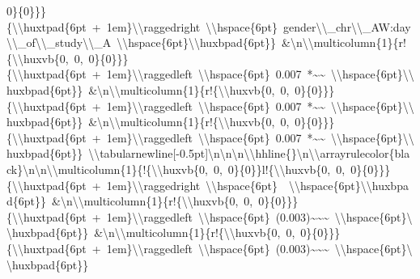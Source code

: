 \documentclass[
  english,
  man]{apa6}
\begin{document}
0\}\{0\}\}\}\{\textbackslash{}\textbackslash{}huxtpad\{6pt\ +\ 1em\}\textbackslash{}\textbackslash{}raggedright\ \textbackslash{}\textbackslash{}hspace\{6pt\}\ gender\textbackslash{}\textbackslash{}\_chr\textbackslash{}\textbackslash{}\_AW:day\textbackslash{}\textbackslash{}\_of\textbackslash{}\textbackslash{}\_study\textbackslash{}\textbackslash{}\_A\ \textbackslash{}\textbackslash{}hspace\{6pt\}\textbackslash{}\textbackslash{}huxbpad\{6pt\}\}\ \&\textbackslash{}n\textbackslash{}\textbackslash{}multicolumn\{1\}\{r!\{\textbackslash{}\textbackslash{}huxvb\{0,\ 0,\ 0\}\{0\}\}\}\{\textbackslash{}\textbackslash{}huxtpad\{6pt\ +\ 1em\}\textbackslash{}\textbackslash{}raggedleft\ \textbackslash{}\textbackslash{}hspace\{6pt\}\ 0.007\ *\textasciitilde{}\textasciitilde{}\ \textbackslash{}\textbackslash{}hspace\{6pt\}\textbackslash{}\textbackslash{}huxbpad\{6pt\}\}\ \&\textbackslash{}n\textbackslash{}\textbackslash{}multicolumn\{1\}\{r!\{\textbackslash{}\textbackslash{}huxvb\{0,\ 0,\ 0\}\{0\}\}\}\{\textbackslash{}\textbackslash{}huxtpad\{6pt\ +\ 1em\}\textbackslash{}\textbackslash{}raggedleft\ \textbackslash{}\textbackslash{}hspace\{6pt\}\ 0.007\ *\textasciitilde{}\textasciitilde{}\ \textbackslash{}\textbackslash{}hspace\{6pt\}\textbackslash{}\textbackslash{}huxbpad\{6pt\}\}\ \&\textbackslash{}n\textbackslash{}\textbackslash{}multicolumn\{1\}\{r!\{\textbackslash{}\textbackslash{}huxvb\{0,\ 0,\ 0\}\{0\}\}\}\{\textbackslash{}\textbackslash{}huxtpad\{6pt\ +\ 1em\}\textbackslash{}\textbackslash{}raggedleft\ \textbackslash{}\textbackslash{}hspace\{6pt\}\ 0.007\ *\textasciitilde{}\textasciitilde{}\ \textbackslash{}\textbackslash{}hspace\{6pt\}\textbackslash{}\textbackslash{}huxbpad\{6pt\}\}\ \textbackslash{}\textbackslash{}tabularnewline{[}-0.5pt{]}\textbackslash{}n\textbackslash{}n\textbackslash{}n\textbackslash{}\textbackslash{}hhline\{\}\textbackslash{}n\textbackslash{}\textbackslash{}arrayrulecolor\{black\}\textbackslash{}n\textbackslash{}n\textbackslash{}\textbackslash{}multicolumn\{1\}\{!\{\textbackslash{}\textbackslash{}huxvb\{0,\ 0,\ 0\}\{0\}\}l!\{\textbackslash{}\textbackslash{}huxvb\{0,\ 0,\ 0\}\{0\}\}\}\{\textbackslash{}\textbackslash{}huxtpad\{6pt\ +\ 1em\}\textbackslash{}\textbackslash{}raggedright\ \textbackslash{}\textbackslash{}hspace\{6pt\}\ \ \textbackslash{}\textbackslash{}hspace\{6pt\}\textbackslash{}\textbackslash{}huxbpad\{6pt\}\}\ \&\textbackslash{}n\textbackslash{}\textbackslash{}multicolumn\{1\}\{r!\{\textbackslash{}\textbackslash{}huxvb\{0,\ 0,\ 0\}\{0\}\}\}\{\textbackslash{}\textbackslash{}huxtpad\{6pt\ +\ 1em\}\textbackslash{}\textbackslash{}raggedleft\ \textbackslash{}\textbackslash{}hspace\{6pt\}\ (0.003)\textasciitilde{}\textasciitilde{}\textasciitilde{}\ \textbackslash{}\textbackslash{}hspace\{6pt\}\textbackslash{}\textbackslash{}huxbpad\{6pt\}\}\ \&\textbackslash{}n\textbackslash{}\textbackslash{}multicolumn\{1\}\{r!\{\textbackslash{}\textbackslash{}huxvb\{0,\ 0,\ 0\}\{0\}\}\}\{\textbackslash{}\textbackslash{}huxtpad\{6pt\ +\ 1em\}\textbackslash{}\textbackslash{}raggedleft\ \textbackslash{}\textbackslash{}hspace\{6pt\}\ (0.003)\textasciitilde{}\textasciitilde{}\textasciitilde{}\ \textbackslash{}\textbackslash{}hspace\{6pt\}\textbackslash{}\textbackslash{}huxbpad\{6pt\}\}\ 
\end{document}
